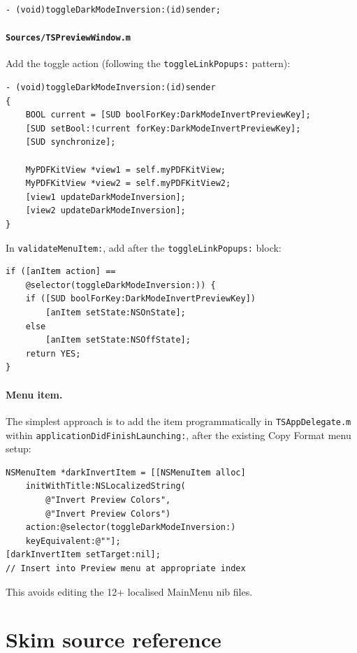 \documentclass[11pt,a4paper]{article}
\begin{document}
\begin{lstlisting}
- (void)toggleDarkModeInversion:(id)sender;
\end{lstlisting}

\paragraph{\texttt{Sources/TSPreviewWindow.m}} Add the toggle action (following
the \texttt{toggleLinkPopups:} pattern):

\begin{lstlisting}
- (void)toggleDarkModeInversion:(id)sender
{
    BOOL current = [SUD boolForKey:DarkModeInvertPreviewKey];
    [SUD setBool:!current forKey:DarkModeInvertPreviewKey];
    [SUD synchronize];

    MyPDFKitView *view1 = self.myPDFKitView;
    MyPDFKitView *view2 = self.myPDFKitView2;
    [view1 updateDarkModeInversion];
    [view2 updateDarkModeInversion];
}
\end{lstlisting}

In \texttt{validateMenuItem:}, add after the \texttt{toggleLinkPopups:} block:

\begin{lstlisting}
if ([anItem action] ==
    @selector(toggleDarkModeInversion:)) {
    if ([SUD boolForKey:DarkModeInvertPreviewKey])
        [anItem setState:NSOnState];
    else
        [anItem setState:NSOffState];
    return YES;
}
\end{lstlisting}

\paragraph{Menu item.} The simplest approach is to add the item
programmatically in \texttt{TSAppDelegate.m} within
\texttt{applicationDidFinishLaunching:}, after the existing Copy Format menu
setup:

\begin{lstlisting}
NSMenuItem *darkInvertItem = [[NSMenuItem alloc]
    initWithTitle:NSLocalizedString(
        @"Invert Preview Colors",
        @"Invert Preview Colors")
    action:@selector(toggleDarkModeInversion:)
    keyEquivalent:@""];
[darkInvertItem setTarget:nil];
// Insert into Preview menu at appropriate index
\end{lstlisting}

This avoids editing the 12+ localised MainMenu nib files.

\section{Skim source reference}
\end{document}
